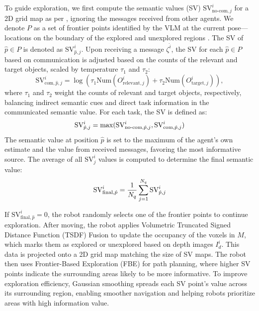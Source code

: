To guide exploration, we first compute the semantic values (SV) $\text{SV}^i_{\text{no-com},j}$ for a 2D grid map as per \cite{ren2024explore}, ignoring the messages received from other agents. 
We denote $P$ as a set of frontier points identified by the VLM at the current pose— locations on the boundary of the explored and unexplored regions \cite{yamauchi1997frontier}.
The SV of ${\hat{p}} \in P$ is denoted as $\text{SV}^i_{{\hat{p}},j}$. 
Upon receiving a message \( \zeta^{\hat{i
}} \),  the SV for each ${\hat{p}} \in P$ based on communication is adjusted based on the counts of the relevant and target objects, scaled by temperature \( \tau_{1} \) and \( \tau_{2} \):
\vspace{-0.15cm}
\begin{equation}
\text{SV}^i_{\text{com},{\hat{p}},j} = \log\left(\tau_{1} \text{Num}(O^i_{\text{relevant},j}) + \tau_{2} \text{Num}(O^i_{\text{target},j})\right),
\end{equation}
where $\tau_1$ and $\tau_2$ weight the counts of relevant and target objects, respectively, balancing indirect semantic cues and direct task information in the communicated semantic value. For each task, the SV is defined as:
\vspace{-0.15cm}
\begin{equation}
\text{SV}^i_{{\hat{p}},j}= \max(\text{SV}^i_{\text{no-com},{\hat{p}},j}, \text{SV}^i_{\text{com},{\hat{p}},j})
\vspace{-0.15cm}
\end{equation}
The semantic value at position $\hat{p}$ is set to the maximum of the agent’s own estimate and the value from received messages, favoring the most informative source. The average of all $\text{SV}^i_{j}$ values is computed to determine the final semantic value:
\vspace{-0.15cm}
\begin{equation}
\text{SV}^i_{\text{final},{\hat{p}}} = 
\frac{1}{N_q} \sum_{j=1}^{N_q} \text{SV}^i_{{\hat{p}},j}
\vspace{-0.15cm}
\end{equation}

If $\text{SV}^i_{\text{final},{\hat{p}}}=0$, the robot randomly selects one of the frontier points to continue exploration. After moving, the robot applies Volumetric Truncated Signed Distance Function (TSDF) Fusion \cite{newcombe2011kinectfusion, zeng20173dmatch} to update the occupancy of the voxels in $M$, which marks them as explored or unexplored based on depth images $I^i_{d}$. This data is projected onto a 2D grid map matching the size of SV maps. The robot then uses Frontier-Based Exploration (FBE) \cite{yamauchi1997frontier} for path planning, where higher SV points indicate the surrounding areas likely to be more informative.
To improve exploration efficiency, Gaussian smoothing spreads each SV point's value across its surrounding region, enabling smoother navigation and helping robots prioritize areas with high information value.

